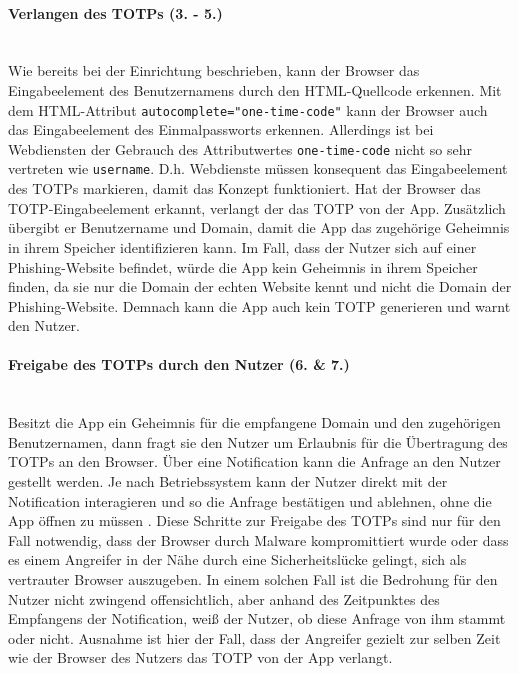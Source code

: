 \paragraph*{Verlangen des TOTPs (3. - 5.)}
\mbox{} \vspace{0.1cm} \\
Wie bereits bei der Einrichtung beschrieben, kann der Browser das Eingabeelement 
des Benutzernamens durch den HTML-Quellcode erkennen. Mit dem HTML-Attribut  
\lstinline{autocomplete="one-time-code"} kann der Browser auch das Eingabeelement des 
Einmalpassworts erkennen. Allerdings ist bei Webdiensten der Gebrauch des 
Attributwertes \lstinline{one-time-code} nicht so sehr vertreten wie \lstinline{username}. D.h. Webdienste müssen konsequent das Eingabeelement des TOTPs 
markieren, damit das Konzept funktioniert.
Hat der Browser das TOTP-Eingabeelement erkannt, verlangt der das TOTP von der 
App. Zusätzlich übergibt er Benutzername und Domain, damit die App das zugehörige 
Geheimnis in ihrem Speicher identifizieren kann. Im Fall, dass der Nutzer sich auf einer Phishing-Website befindet, würde die App kein Geheimnis in ihrem Speicher finden, da sie nur die Domain der echten Website kennt und nicht die Domain der Phishing-Website. Demnach kann die App auch kein TOTP generieren und warnt den Nutzer.

\paragraph*{Freigabe des TOTPs durch den Nutzer (6. \& 7.)}
\mbox{} \vspace{0.1cm} \\
Besitzt die App ein Geheimnis für die empfangene Domain und den zugehörigen Benutzernamen, dann fragt sie den Nutzer um Erlaubnis für die Übertragung des 
TOTPs an den Browser. Über eine Notification kann die Anfrage an den Nutzer 
gestellt werden. Je nach Betriebssystem kann der Nutzer direkt mit der 
Notification interagieren und so die Anfrage bestätigen und ablehnen, ohne die 
App öffnen zu müssen \autocite{appleNotify,androidNotify}. 
Diese Schritte zur Freigabe des TOTPs sind nur für den Fall notwendig, dass der 
Browser durch Malware kompromittiert wurde oder dass es einem Angreifer in der 
Nähe durch eine Sicherheitslücke gelingt, sich als vertrauter Browser auszugeben. 
In einem solchen Fall ist die Bedrohung für den Nutzer nicht zwingend 
offensichtlich, aber anhand des Zeitpunktes des Empfangens der Notification, weiß 
der Nutzer, ob diese Anfrage von ihm stammt oder nicht. Ausnahme ist hier der 
Fall, dass der Angreifer gezielt zur selben Zeit wie der Browser des Nutzers das 
TOTP von der App verlangt.

